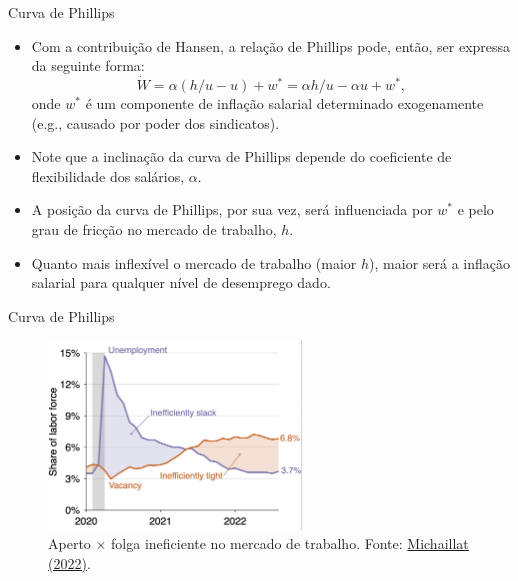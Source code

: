 \documentclass[10pt]{beamer}
\begin{document}
\begin{frame}{Curva de Phillips}
    \begin{itemize}
        \item Com a contribuição de Hansen, a relação de Phillips pode, então, ser expressa da seguinte forma:
        \begin{equation}
            \dot{W} = \alpha(h/u - u) + w^* = \alpha h/u - \alpha u + w^*,
            \label{eq9}
        \end{equation}
        onde $w^*$ é um componente de inflação salarial determinado exogenamente (e.g., causado por poder dos sindicatos).
        \bigskip
        \item Note que a inclinação da curva de Phillips depende do coeficiente de flexibilidade dos salários, $\alpha$.
        \bigskip
        \item A posição da curva de Phillips, por sua vez, será influenciada por $w^*$ e pelo grau de fricção no mercado de trabalho, $h$.
        \bigskip
        \item Quanto mais inflexível o mercado de trabalho (maior $h$), maior será a inflação salarial para qualquer nível de desemprego dado.
    \end{itemize}
\end{frame}

\begin{frame}{Curva de Phillips}
    \begin{figure}
        \centering
        \includegraphics[width=0.6\textwidth]{./figures/aula8_fig6.PNG}
        \caption{Aperto $\times$ folga ineficiente no mercado de trabalho. Fonte: \href{https://twitter.com/pmichaillat/status/1565709944057241600}{Michaillat (2022)}.}
        \label{fig:uv}
    \end{figure}
\end{frame}
\end{document}
